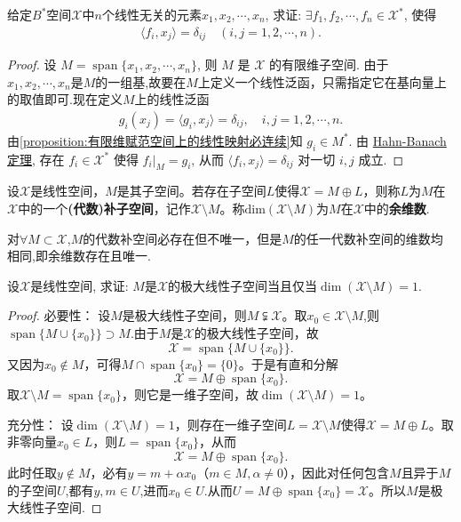 \documentclass[../../main.tex]{subfiles}%
\begin{document}
\begin{example}
给定$B^*$空间$\mathscr{X}$中$n$个线性无关的元素$x_1, x_2, \cdots, x_n$, 求证: $\exists f_1, f_2, \cdots, f_n \in \mathscr{X}^*$, 使得
\begin{align*}
\langle f_i, x_j \rangle = \delta_{ij} \quad (i,j=1,2,\cdots,n).
\end{align*}
\end{example}
\begin{proof}
设 $M = \operatorname{span}\{x_1, x_2, \cdots, x_n\}$, 则 $M$ 是 $\mathscr{X}$ 的有限维子空间. 由于 $x_1, x_2, \cdots, x_n$是$M$的一组基,故要在$M$上定义一个线性泛函，只需指定它在基向量上的取值即可.现在定义$M$上的线性泛函
\begin{align*}
g_i(x_j)=\langle g_i, x_j \rangle = \delta_{ij},\quad i,j = 1,2,\cdots,n.
\end{align*}
由\cref{proposition:有限维赋范空间上的线性映射必连续}知 $g_i \in M^*$. 由 \hyperref[theorem:泛函分析--(哈恩-巴拿赫)Hahn-Banach定理]{Hahn-Banach定理}, 存在 $f_i \in \mathscr{X}^*$ 使得 $f_i|_M = g_i$, 从而 $\langle f_i, x_j \rangle = \delta_{ij}$ 对一切 $i,j$ 成立.
\end{proof}

\begin{definition}
设$\mathscr{X}$是线性空间，$M$是其子空间。若存在子空间$L$使得$\mathscr{X}=M\oplus L$，则称$L$为$M$在$\mathscr{X}$中的一个\textbf{(代数)补子空间}，记作$\mathscr{X}\setminus M$。称$\text{dim}(\mathscr{X}\setminus M)$为$M$在$\mathscr{X}$中的\textbf{余维数}.
\end{definition}
\begin{remark}
对$\forall M\subset \mathscr{X}$,$M$的代数补空间必存在但不唯一，但是$M$的任一代数补空间的维数均相同,即余维数存在且唯一.
\end{remark}

\begin{proposition}
设$\mathscr{X}$是线性空间, 求证: $M$是$\mathscr{X}$的极大线性子空间当且仅当$\dim(\mathscr{X} \setminus M) = 1$.
\end{proposition}
\begin{proof}

{\heiti 必要性：}
设$M$是极大线性子空间，则$M \subsetneqq \mathscr{X}$。取$x_0 \in \mathscr{X} \setminus M$,则$ \operatorname{span}\{M \cup \{x_0\}\}\supset M$.由于$M$是$\mathscr{X}$的极大线性子空间，故
\[
\mathscr{X} = \operatorname{span}\{M \cup \{x_0\}\}.
\]
又因为$x_0 \notin M$，可得$M \cap \operatorname{span}\{x_0\} = \{0\}$。于是有直和分解
\[
\mathscr{X} = M \oplus \operatorname{span}\{x_0\}.
\]
取$\mathscr{X} \setminus M = \operatorname{span}\{x_0\}$，则它是一维子空间，故$\dim(\mathscr{X} \setminus M) = 1$。

{\heiti 充分性：}
设$\dim(\mathscr{X} \setminus M) = 1$，则存在一维子空间$L = \mathscr{X} \setminus M$使得$\mathscr{X} = M \oplus L$。取非零向量$x_0 \in L$，则$L = \operatorname{span}\{x_0\}$，从而
\[
\mathscr{X} = M \oplus \operatorname{span}\{x_0\}.
\]
此时任取$y \notin M$，必有$y = m + \alpha x_0$（$m \in M, \alpha \neq 0$），因此对任何包含$M$且异于$M$的子空间$U$,都有$y,m\in U$,进而$x_0\in U$.从而$U=M \oplus \operatorname{span}\{x_0\}=\mathscr{X}$。所以$M$是极大线性子空间.
\end{proof}
\end{document}
